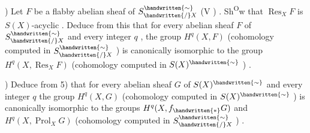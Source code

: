 ) Let \(F\) be a flabby abelian sheaf of \(S^{\handwritten{\sim}}_{\handwritten{/}X}\) (V ) . Sh\textsuperscript{O}w that \(\operatorname{Res}_X F\) is \(S(X)\)-acyclic%
\reversemarginpar{}\normalmarginpar . Deduce from this that for every abelian sheaf \(F\) of \(S^{\handwritten{\sim}}_{\handwritten{/}X}\) and every integer \(q\) , the group \(H^q(X,F)\) (cohomology computed in \(S^{\handwritten{\sim}}_{\handwritten{/}X}\) ) is canonically isomorphic to the group \(H^q(X,\operatorname{Res}_X F)\) (cohomology computed in \(S(X)^{\handwritten{\sim}}\) ) .

) Deduce from 5) that for every abelian sheaf \(G\)  of \(S(X)^{\handwritten{\sim}}\) and every integer \(q\) the group \(H^q(X,G)\)  (cohomology computed in \(S(X)^{\handwritten{\sim}}\) ) is canonically isomorphic to the groups \(H^q(X,f_{\handwritten{*}}G)\) and \(H^q(X,\operatorname{Prol}_X G)\) (cohomology computed in \(S^{\handwritten{\sim}}_{\handwritten{/}X}\) ) .
